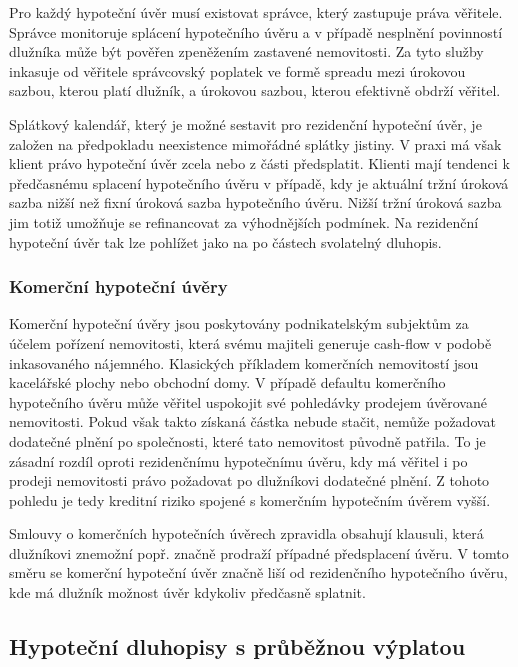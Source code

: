 \documentclass[a4paper]{book}
\begin{document}
Pro každý hypoteční úvěr musí existovat správce, který zastupuje práva věřitele. Správce monitoruje splácení hypotečního úvěru a v případě nesplnění povinností dlužníka může být pověřen zpeněžením zastavené nemovitosti. Za tyto služby inkasuje od věřitele správcovský poplatek ve formě spreadu mezi úrokovou sazbou, kterou platí dlužník, a úrokovou sazbou, kterou efektivně obdrží věřitel.

Splátkový kalendář, který je možné sestavit pro rezidenční hypoteční úvěr, je založen na předpokladu neexistence mimořádné splátky jistiny. V praxi má však klient právo hypoteční úvěr zcela nebo z části předsplatit. Klienti mají tendenci k předčasnému splacení hypotečního úvěru v případě, kdy je aktuální tržní úroková sazba nižší než fixní úroková sazba hypotečního úvěru. Nižší tržní úroková sazba jim totiž umožňuje se refinancovat za výhodnějších podmínek. Na rezidenční hypoteční úvěr tak lze pohlížet jako na po částech svolatelný dluhopis.


\subsubsection{Komerční hypoteční úvěry}

Komerční hypoteční úvěry jsou poskytovány podnikatelským subjektům za účelem pořízení nemovitosti, která svému majiteli generuje cash-flow v podobě inkasovaného nájemného. Klasických příkladem komerčních nemovitostí jsou kacelářské plochy nebo obchodní domy. V případě defaultu komerčního hypotečního úvěru může věřitel uspokojit své pohledávky prodejem úvěrované nemovitosti. Pokud však takto získaná částka nebude stačit, nemůže požadovat dodatečné plnění po společnosti, které tato nemovitost původně patřila. To je zásadní rozdíl oproti rezidenčnímu hypotečnímu úvěru, kdy má věřitel i po prodeji nemovitosti právo požadovat po dlužníkovi dodatečné plnění. Z tohoto pohledu je tedy kreditní riziko spojené s komerčním hypotečním úvěrem vyšší.

Smlouvy o komerčních hypotečních úvěrech zpravidla obsahují klausuli, která dlužníkovi znemožní popř. značně prodraží případné předsplacení úvěru. V tomto směru se komerční hypoteční úvěr značně liší od rezidenčního hypotečního úvěru, kde má dlužník možnost úvěr kdykoliv předčasně splatnit.

\subsection{Hypoteční dluhopisy s průběžnou výplatou}
\end{document}
